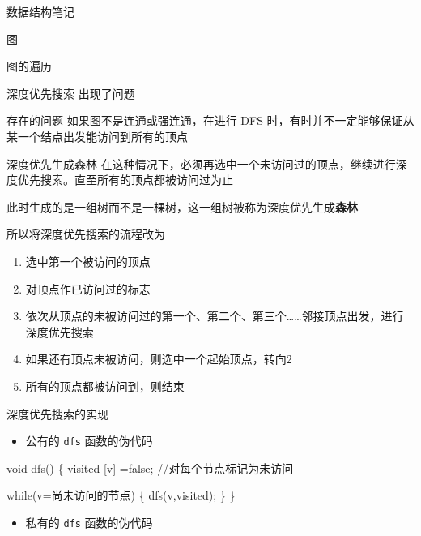 \documentclass[
  ignorenonframetext,
]{beamer}
\newenvironment{Shaded}{}{}
\newcommand{\NormalTok}[1]{#1}
\providecommand{\tightlist}{%
  \setlength{\itemsep}{0pt}\setlength{\parskip}{0pt}}
\begin{document}
\begin{frame}[fragile]{数据结构笔记}
\begin{block}{图}
\begin{block}{图的遍历}
\begin{block}{深度优先搜索}
出现了问题

\begin{block}{存在的问题}
\protect{}\label{ux5b58ux5728ux7684ux95eeux9898}
\protect{}\label{DFSdamn}{如果图不是连通或强连通，在进行
DFS 时，有时并不一定能够保证从某一个结点出发能访问到所有的顶点}
\end{block}

\begin{block}{深度优先生成森林}
\protect{}\label{ux6df1ux5ea6ux4f18ux5148ux751fux6210ux68eeux6797}
在这种情况下，必须再选中一个未访问过的顶点，继续进行深度优先搜索。直至所有的顶点都被访问过为止

此时生成的是一组树而不是一棵树，这一组树被称为深度优先生成\textbf{森林}

所以将深度优先搜索的流程改为

\begin{enumerate}
\tightlist
\item
  选中第一个被访问的顶点
\item
  对顶点作已访问过的标志
\item
  依次从顶点的未被访问过的第一个、第二个、第三个\ldots\ldots 邻接顶点出发，进行深度优先搜索
\item
  如果还有顶点未被访问，则选中一个起始顶点，转向2
\item
  所有的顶点都被访问到，则结束
\end{enumerate}
\end{block}

\begin{block}{深度优先搜索的实现}
\protect{}\label{ux6df1ux5ea6ux4f18ux5148ux641cux7d22ux7684ux5b9eux73b0}
\begin{itemize}
\tightlist
\item
  公有的 \texttt{dfs} 函数的伪代码
\end{itemize}

\begin{Shaded}
\begin{Highlighting}[]
\NormalTok{void dfs()}
\NormalTok{\{}
\NormalTok{  visited [v] =false; //对每个节点标记为未访问}

\NormalTok{  while(v=尚未访问的节点)}
\NormalTok{  \{}
\NormalTok{    dfs(v,visited);}
\NormalTok{  \}}
\NormalTok{\}}
\end{Highlighting}
\end{Shaded}

\begin{itemize}
\tightlist
\item
  私有的 \texttt{dfs} 函数的伪代码
\end{itemize}


\end{block}
\end{block}
\end{block}
\end{block}
\end{frame}
\end{document}
